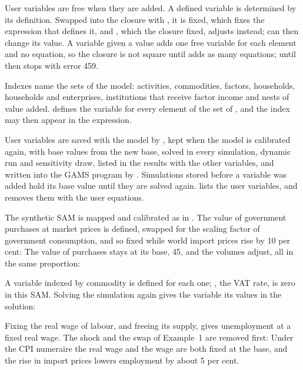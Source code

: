 User variables are free when they are added. A defined variable is determined
by its definition. Swapped into the closure with
 \cmd{)}, it is fixed, which
fixes the expression that defines it, and , which the closure
fixed, adjusts instead;  can then change its value. A
variable given a value adds one free variable for each element and no
equation, so the closure is not square until  adds as
many equations; until then  stops with error 459.

Indexes name the sets of the model:  activities,  commodities,
 factors,  households,  households and enterprises,
 institutions that receive factor income and  nests of value
added. \cmd{(}\cmd{)} defines the variable for every element
of the set of , and the index may then appear in the expression.

User variables are saved with the model by , kept when the
model is calibrated again, with base values from the new base, solved in every
simulation, dynamic run and sensitivity draw, listed in the results with the
other variables, and written into the GAMS program by .
Simulations stored before a variable was added hold its base value until they
are solved again.  lists the user variables, and
 removes them with the user equations.


The synthetic SAM is mapped and calibrated as in . The value
of government purchases at market prices is defined, swapped for the scaling
factor of government consumption, and so fixed while world import prices rise
by 10 per cent:
The value of purchases stays at its base, 45, and the volumes adjust, all in
the same proportion:


A variable indexed by commodity is defined for each one; , the VAT
rate, is zero in this SAM. Solving the simulation again gives the variable its
values in the solution:


Fixing the real wage of labour, and freeing its supply, gives unemployment at
a fixed real wage. The shock and the swap of Example~1 are removed first:
Under the CPI numeraire the real wage and the wage are both fixed at the base,
and the rise in import prices lowers employment by about 5 per cent.

